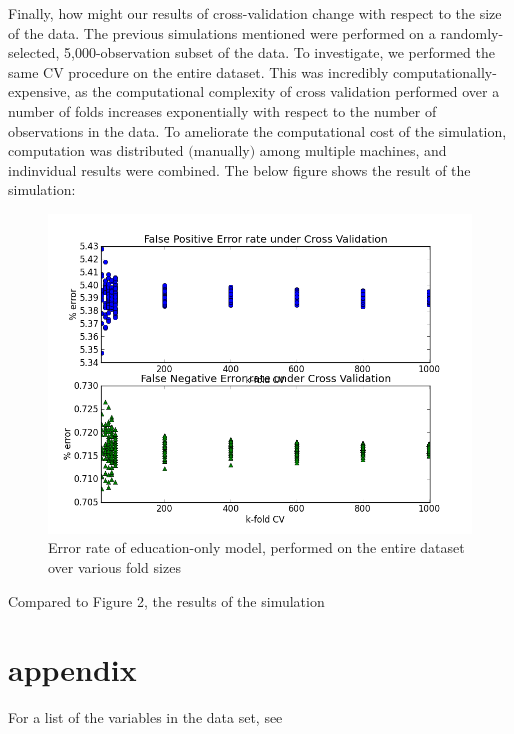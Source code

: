 \documentclass[11pt]{article}
\begin{document}
Finally, how might our results of cross-validation change with respect to the size of the data. The previous simulations mentioned were performed on a randomly-selected, 5,000-observation subset of the data. To investigate, we performed the same CV procedure on the entire dataset. This was incredibly computationally-expensive, as the computational complexity of cross validation performed over a number of folds increases exponentially with respect to the number of observations in the data. To ameliorate the computational cost of the simulation, computation was distributed $($manually$)$ among multiple machines, and indinvidual results were combined.  The below figure shows the result of the simulation:
\begin{figure}[H]
\centering
\includegraphics[width = 12cm]{CV_FULLn_1Kfold.png}
\caption{Error rate of education-only model, performed on the entire dataset over various fold sizes}
\end{figure}

Compared to Figure 2, the results of the simulation


\section{appendix}
For a list of the variables in the data set, see 
\end{document}
